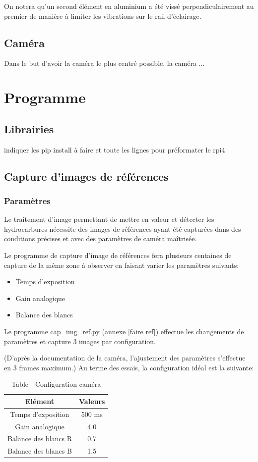 On notera qu'un second élément en aluminium a été vissé perpendiculairement au premier de manière à limiter les vibrations sur le rail d'éclairage.

\subsection{Caméra}
Dans le but d'avoir la caméra le plus centré possible, la caméra ...
\section{Programme}
\subsection{Librairies}
indiquer les pip install à faire et toute les lignes pour préformater le rpi4
\subsection{Capture d'images de références}
\subsubsection{Paramètres}
Le traitement d'image permettant de mettre en valeur et détecter les hydrocarbures nécessite des images de références ayant été capturées dans des conditions précises et avec des paramètres de caméra maîtrisée.

Le programme de capture d'image de références fera plusieurs centaines de capture de la même zone à observer en faisant varier les paramètres suivants:
\begin{itemize}
    \item Temps d'exposition
    \item Gain analogique
    \item Balance des blancs
\end{itemize}

Le programme \underline{cap\_img\_ref.py} (annexe [faire ref]) effectue les changements de paramètres et capture 3 images par configuration.

(D'après la documentation de la caméra, l'ajustement des paramètres s'effectue en 3 frames maximum.)
Au terme des essais, la configuration idéal est la suivante:

\begin{table}[H]
    \begin{center}
        \caption{Table - Configuration caméra}
        \begin{tabular}{|c|c|}
            Elément              & Valeurs                \\ \hline
            Temps d'exposition   & 500 \si{\milli\second} \\
            Gain analogique      & 4.0                    \\
            Balance des blancs R & 0.7                    \\
            Balance des blancs B & 1.5                    \\
        \end{tabular}
    \end{center}
\end{table}

